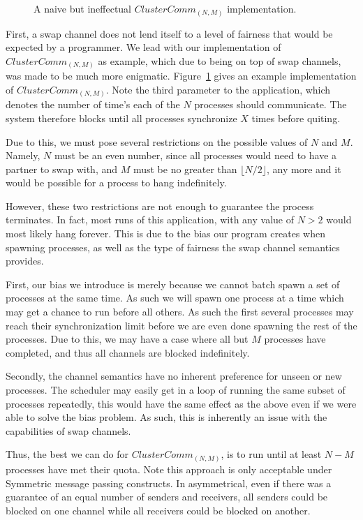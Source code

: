 \begin{figure}
\centering
\inputminted[frame=lines,fontsize=\footnotesize]{csharp}{code/badclustercomm.els}
\caption{A naive but ineffectual $ClusterComm_{(N,M)}$ implementation.} 
\label{fig:bad-clustercomm}
\end{figure}

First, a swap channel does not lend itself to a level of fairness that would be
expected by a programmer. We lead with our implementation of 
$ClusterComm_{(N,M)}$ as example, which due to being on top of swap channels, 
was made to be much more enigmatic. Figure~\ref{fig:bad-clustercomm} gives an
example implementation of $ClusterComm_{(N,M)}$. Note the third parameter to
the application, which denotes the number of time's each of the $N$ processes
should communicate. The system therefore blocks until all processes synchronize
$X$ times before quiting.

Due to this, we must pose several restrictions on the possible values of $N$ and
$M$. Namely, $N$ must be an even number, since all processes would need to have a 
partner to swap with, and $M$ must be no greater than $\lfloor N/2 \rfloor$, any
more and it would be possible for a process to hang indefinitely.

However, these two restrictions are not enough to guarantee the process terminates.
In fact, most runs of this application, with any value of $N > 2$ would most 
likely hang forever. This is due to the bias our program creates when spawning
processes, as well as the type of fairness the swap channel semantics provides.

First, our bias we introduce is merely because we cannot batch spawn a set of
processes at the same time. As such we will spawn one process at a time which
may get a chance to run before all others. As such the first several processes
may reach their synchronization limit before we are even done spawning the rest
of the processes. Due to this, we may have a case where all but $M$ processes
have completed, and thus all channels are blocked indefinitely.

Secondly, the channel semantics have no inherent preference for unseen 
or new processes. The scheduler may easily get in a loop of running the same
subset of processes repeatedly, this would have the same effect as the above
even if we were able to solve the bias problem. As such, this is inherently an
issue with the capabilities of swap channels. 

Thus, the best we can do for $ClusterComm_{(N,M)}$, is to run until at least 
$N-M$ processes have met their quota. Note this approach is only acceptable 
under Symmetric message passing constructs. In asymmetrical, even if there was
a guarantee of an equal number of senders and receivers, all senders could be
blocked on one channel while all receivers could be blocked on another. 

